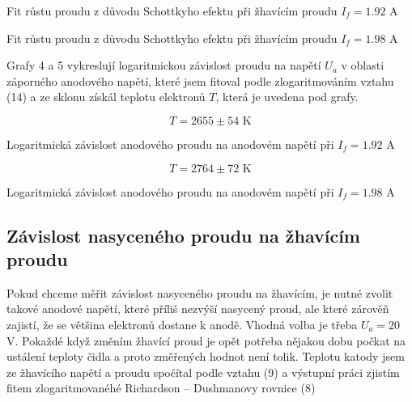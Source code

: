 \documentclass[a4paper,11pt]{article}
\begin{document}
\begin{table}[h]
    \captionsetup{type=graph}
    \begin{minipage}{.47\linewidth}
        \centering
        \resizebox{\textwidth}{!}{  }
        \caption{Fit růstu proudu z důvodu Schottkyho efektu při žhavícím proudu $ I_f = 1.92 $ A }
    \end{minipage}
    \hfill
    \begin{minipage}{.45\linewidth}
        \centering
        \resizebox{\textwidth}{!}{  }
        \caption{Fit růstu proudu z důvodu Schottkyho efektu při žhavícím proudu $ I_f = 1.98 $ A }
    \end{minipage}
\end{table}

\newpage

Grafy 4 a 5 vykreslují logaritmickou závislost proudu na napětí $ U_a $ v oblasti záporného anodového napětí, které jsem fitoval podle zlogaritmováním vztahu (14) a ze sklonu získál teplotu elektronů $ T $, která je uvedena pod grafy. 

\begin{table}[h]
    \captionsetup{type=graph}
    \begin{minipage}{.45\linewidth}
        \centering
        \resizebox{\textwidth}{!}{  }
        \[ T = 2655 \pm 54 \text{ K} \]
        \caption{ Logaritmická závislost anodového proudu na anodovém napětí při $ I_f = 1.92 $ A }
    \end{minipage}
    \hfill
    \begin{minipage}{.45\linewidth}
        \centering
        \resizebox{\textwidth}{!}{  }
        \[ T = 2764 \pm 72 \text{ K} \]

        \caption{Logaritmická závislost anodového proudu na anodovém napětí při $ I_f = 1.98 $ A }
    \end{minipage}
\end{table}

\subsection{Závislost nasyceného proudu na žhavícím proudu}

Pokud chceme měřit závislost nasyceného proudu na žhavícím, je nutné zvolit takové anodové napětí, které příliš nezvýší nasycený proud, ale které zárověň zajistí, že se většina elektronů dostane k anodě. Vhodná volba je třeba $ U_a = 20 $ V. Pokaždé když změním žhavící proud je opět potřeba nějakou dobu počkat na ustálení teploty čidla a proto změřených hodnot není tolik. Teplotu katody jsem ze žhavícího napětí a proudu spočítal podle vztahu (9) a výstupní práci zjistím fitem zlogaritmovanéhé Richardson – Dushmanovy rovnice (8)
\end{document}
